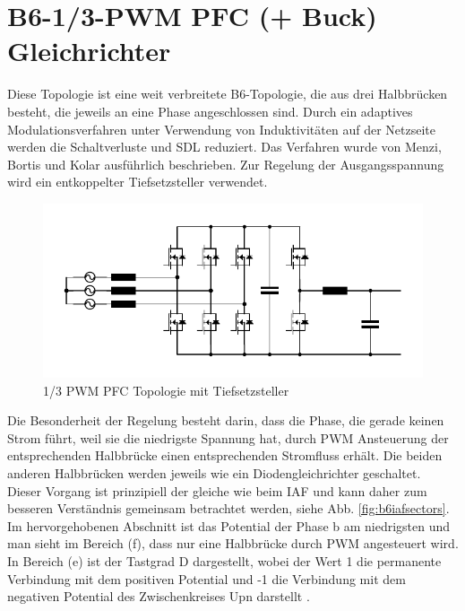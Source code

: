 \section{B6-1/3-PWM PFC (+ Buck) Gleichrichter}
	\label{sec:GrundlagenB6}
	Diese Topologie ist eine weit verbreitete B6-Topologie, die aus drei Halbbrücken besteht, die jeweils an eine Phase angeschlossen sind. Durch ein adaptives Modulationsverfahren unter Verwendung von Induktivitäten auf der Netzseite werden die Schaltverluste und \gls{SDL} reduziert. Das Verfahren wurde von Menzi, Bortis und Kolar \cite{13PWMPFC} ausführlich beschrieben. Zur Regelung der Ausgangsspannung wird ein entkoppelter Tiefsetzsteller verwendet.\\
	
	\begin{figure}
		\centering
		\includegraphics[width=0.9\linewidth]{content/Grafiken/B6_Buck}
		\caption[1/3 PWM PFC Topologie mit Tiefsetzsteller]{1/3 PWM PFC Topologie mit Tiefsetzsteller}
		\label{fig:b6buck}
	\end{figure}
	
	Die Besonderheit der Regelung besteht darin, dass die Phase, die gerade keinen Strom führt, weil sie die niedrigste Spannung hat, durch \gls{PWM} Ansteuerung der entsprechenden Halbbrücke einen entsprechenden Stromfluss erhält. Die beiden anderen Halbbrücken werden jeweils wie ein Diodengleichrichter geschaltet. Dieser Vorgang ist prinzipiell der gleiche wie beim \gls{IAF} und kann daher zum besseren Verständnis gemeinsam betrachtet werden, siehe Abb. \ref{fig:b6iafsectors}.
	Im hervorgehobenen Abschnitt ist das Potential der Phase b am niedrigsten und man sieht im Bereich (f), dass nur eine Halbbrücke durch \gls{PWM} angesteuert wird. In Bereich (e) ist der Tastgrad \gls{D} dargestellt, wobei der Wert 1 die permanente Verbindung mit dem positiven Potential und -1 die Verbindung mit dem negativen Potential des Zwischenkreises \gls{Upn} darstellt \cite{13PWMPFC}.\\ 
		
